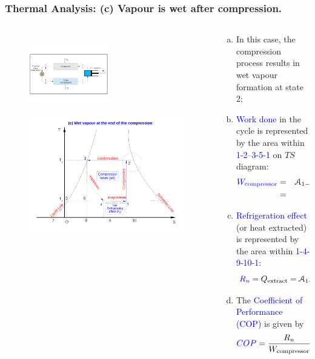 \documentclass[10pt,compress]{beamer}
\newcommand{\frc}{\displaystyle\frac}
\begin{document}
\begin{frame}
 \frametitle{Thermal Analysis: (c) Vapour is wet after compression.}
 \begin{columns}
  \begin{column}[c]{0.35\linewidth}
   \begin{figure}%
     \vbox{
      \includegraphics[width=3.5cm,height=3.5cm,clip]{./Pics/Overview_Refrig12}
      \vspace{-.6cm}
      \includegraphics[width=4.cm,height=4.cm,clip]{./Pics/Overview_Refrig16}}
   \end{figure}  
  \end{column}  
  \begin{column}[c]{0.65\linewidth}
   \begin{enumerate}[(a)]
    \item <1-> In this case, the compression process results in wet vapour formation at state 2;
    \item <2-> \textcolor{blue}{Work done} in the cycle is represented by the area within \textcolor{blue}{1-2--3-5-1} on $TS$ diagram:
      \begin{eqnarray} 
       \textcolor{blue}{W_{\text{compressor}}} &=& \mathcal{A}_{1-2--3-5-1} \nonumber \\
         &=& \textcolor{blue}{H_{2}-H_{1}} \nonumber
      \end{eqnarray}
     \item <3-> \textcolor{blue}{Refrigeration effect} (or heat extracted) is represented by the area within \textcolor{blue}{1-4-9-10-1}:
      \begin{displaymath}
       \textcolor{blue}{R_{n}} = Q_{\text{extract}} = \mathcal{A}_{1-4-9-10-1} = \textcolor{blue}{H_{1}-H_{4}}
      \end{displaymath}
    \item <4-> The \textcolor{blue}{Coefficient of Performance (COP)} is given by
      \begin{displaymath}
       \textcolor{blue}{COP}= \frc{R_{n}}{W_{\text{compressor}}}=\textcolor{blue}{\frc{H_{1}-H_{4}}{H_{2}-H_{1}}}
      \end{displaymath}
   \end{enumerate}
  \end{column}  
 \end{columns} 
\end{frame}
\end{document}
